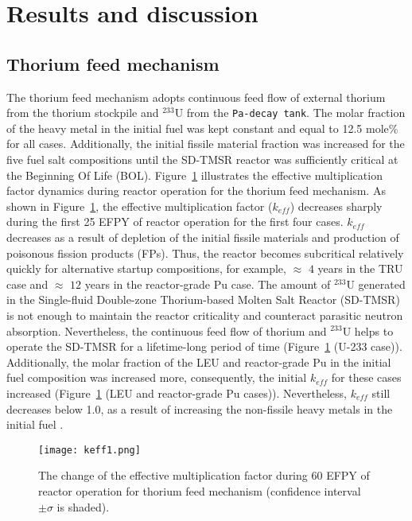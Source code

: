 \section{Results and discussion} \label{Results-and-discussion}

\subsection{Thorium feed mechanism}

The thorium feed mechanism adopts continuous feed flow of external thorium from the thorium stockpile and 
$^{233}$U from the \texttt{Pa-decay tank}. The molar fraction of the heavy metal 
in the initial fuel was kept constant and equal to 12.5 mole\% for all cases. 
Additionally, the initial fissile material fraction was increased for the five fuel 
salt compositions until the \gls{SD-TMSR} reactor was sufficiently critical at 
the Beginning Of Life (BOL). 
Figure~\ref{fig:keff1} illustrates the effective multiplication factor 
dynamics during reactor operation for the thorium feed mechanism. As shown in 
Figure~\ref{fig:keff1}, the effective multiplication factor ($k_{eff}$) 
decreases sharply during the first 25 \gls{EFPY} of reactor operation for the first 
four cases. $k_{eff}$ decreases as a result of depletion of the initial 
fissile materials and production of poisonous fission products (FPs). Thus, the 
reactor becomes subcritical relatively quickly for alternative startup 
compositions, for example, $\approx$ $4$ years in the \gls{TRU} case and $\approx$ $12$ 
years in the reactor-grade Pu case. The amount of $^{233}$U generated in 
the Single-fluid Double-zone Thorium-based Molten Salt Reactor (SD-TMSR) is not enough to maintain the reactor criticality and 
counteract parasitic neutron absorption. Nevertheless, 
the continuous feed flow of thorium and $^{233}$U helps to operate the 
\gls{SD-TMSR} for a lifetime-long period of time (Figure~\ref{fig:keff1} (U-233 case)). 
Additionally, the molar fraction of the LEU and reactor-grade Pu in the initial fuel composition was increased
more, consequently, the initial $k_{eff}$ for these cases increased (Figure~\ref{fig:keff1} (LEU and reactor-grade Pu cases)). Nevertheless, $k_{eff}$ still decreases below 1.0, as a result of increasing the non-fissile heavy metals in the initial fuel \cite{betzler2016modeling}.

\begin{figure}
	\centering
	\texttt{[image: keff1.png]}
		\vspace{-0.5in}
	\caption{The change of the effective multiplication factor during 60 \gls{EFPY} of reactor operation for thorium feed mechanism (confidence interval $\pm\sigma$ is shaded).} 
	\label{fig:keff1}
\end{figure}

